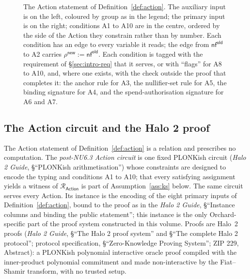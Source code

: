 \documentclass[11pt,a4paper]{article}
\theoremstyle{definition}
\newcommand{\Rel}{\mathcal{R}}
\newcommand{\nfsym}{\mathsf{nf}}
\begin{document}
\begin{figure}[p]
\caption{The Action statement of Definition~\ref{def:action}. The auxiliary
input is on the left, coloured by group as in the legend; the primary input
is on the right; conditions A1 to A10 are in the centre, ordered by the side
of the Action they constrain rather than by number. Each condition has an
edge to every variable it reads; the edge from $\nfsym^{\mathsf{old}}$ to A2
carries $\rho^{\mathsf{new}} := \nfsym^{\mathsf{old}}$. Each condition is
tagged with the requirement of \S\ref{sec:intro-req} that it serves, or with
``flags'' for A8 to A10, and, where one exists, with the check outside the
proof that completes it: the anchor rule for A3, the nullifier-set rule for
A5, the binding signature for A4, and the spend-authorisation signature for
A6 and A7.}
\label{fig:action}
\end{figure}

\FloatBarrier
\subsection{The Action circuit and the Halo 2 proof}\label{sec:action-circuit}

The Action statement of Definition~\ref{def:action} is a relation and
prescribes no computation. The \emph{post-NU6.3 Action circuit} is one fixed
PLONKish circuit (\emph{Halo 2 Guide}, \S``PLONKish arithmetisation'') whose
constraints are designed to encode the typing and conditions A1 to A10; that
every satisfying assignment yields a witness of $\Rel_{\mathsf{Action}}$ is
part of Assumption~\ref{ass:ks} below. The same circuit serves every Action.
Its instance is the encoding of the eight primary inputs of
Definition~\ref{def:action}, bound to the proof as in the \emph{Halo 2
Guide}, \S``Instance columns and binding the public statement''; this
instance is the only Orchard-specific part of the proof system constructed in
this volume. Proofs are Halo~2 proofs (\emph{Halo 2 Guide}, \S``The Halo 2
proof system'' and \S``The complete Halo 2 protocol''; protocol
specification, \S``Zero-Knowledge Proving System''; ZIP 229, Abstract): a
PLONKish polynomial interactive oracle proof compiled with the inner-product
polynomial commitment and made non-interactive by the Fiat--Shamir
transform, with no trusted setup.
\end{document}
